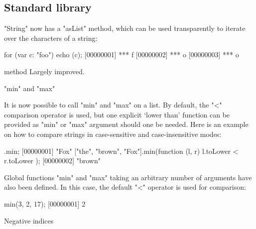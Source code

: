 \subsection{Standard library}
\begin{description}

\item {}

  "String" now has a "asList" method, which can be used transparently to
  iterate over the characters of a string:

\begin{urbiscript}
for (var c: "foo") echo (c);
[00000001] *** f
[00000002] *** o
[00000003] *** o
\end{urbiscript}

\item {} method Largely improved.

\item "min" and "max"

It is now possible to call "min" and "max" on a list. By default, the
"<" comparison operator is used, but one explicit `lower than'
function can be provided as "min" or "max" argument should one be
needed. Here is an example on how to compare strings in case-sensitive
and case-insensitive modes:

\begin{urbiscript}
.min;
[00000001] "Fox"
["the", "brown", "Fox"].min(function (l, r) { l.toLower < r.toLower });
[00000002] "brown"
\end{urbiscript}

Global functions "min" and "max" taking an arbitrary number of
arguments have also been defined. In this case, the default "<"
operator is used for comparison:

\begin{urbiscript}
min(3, 2, 17);
[00000001] 2
\end{urbiscript}

\item Negative indices


\end{description}
